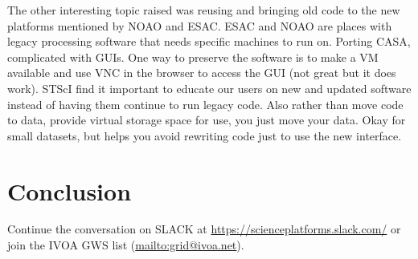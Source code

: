 \documentclass[11pt,twoside]{article}
\begin{document}
The other interesting topic raised was  reusing and bringing old code to the new platforms mentioned by NOAO and ESAC.
ESAC and NOAO are places with legacy processing software that needs specific machines to run on.
Porting CASA, complicated with GUIs.
One way to preserve the software is to make a VM available and use VNC in the browser to access the GUI (not great but it does work).
STScI find it  important to educate our users on new and updated software instead of having them continue to run legacy code.
Also rather than move code to data, provide virtual storage space for use, you just move your data. Okay for small datasets, but helps you avoid rewriting code just to use the new interface.




\section{Conclusion}
Continue the conversation on SLACK at \url{https://scienceplatforms.slack.com/} or join the IVOA GWS list (\url{mailto:grid@ivoa.net}).

\end{document}
